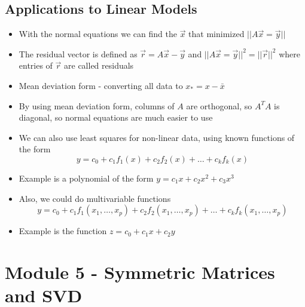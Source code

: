 \documentclass{article}
\begin{document}
\subsection{Applications to Linear Models}
\begin{itemize}
    \item With the normal equations we can find the \(\vec{x}\) that minimized \(||A\vec{x}=\vec{y}||\)
    \item The residual vector is defined as \(\vec{r}=A\vec{x}-\vec{y}\) and \(||A\vec{x}=\vec{y}||^2=||\vec{r}||^2\) where entries of \(\vec{r}\) are called residuals 
    \item Mean deviation form - converting all data to \(x_* = x-\bar{x}\)
    \item By using mean deviation form, columns of \(A\) are orthogonal, so \(A^TA\) is diagonal, so normal equations are much easier to use 
    \item We can also use least squares for non-linear data, using known functions of the form \[y=c_0+c_1f_1(x)+c_2f_2(x)+\dots+c_kf_k(x)\]
    \item Example is a polynomial of the form \(y=c_1x+c_2x^2+c_3x^3\)
    \item Also, we could do multivariable functions \[y=c_0+c_1f_1(x_1,\dots,x_p)+c_2f_2(x_1,\dots,x_p)+\dots+c_kf_k(x_1,\dots,x_p)\]
    \item Example is the function \(z=c_0+c_1x+c_2y\)
\end{itemize}

\section{Module 5 - Symmetric Matrices and SVD}
\end{document}
